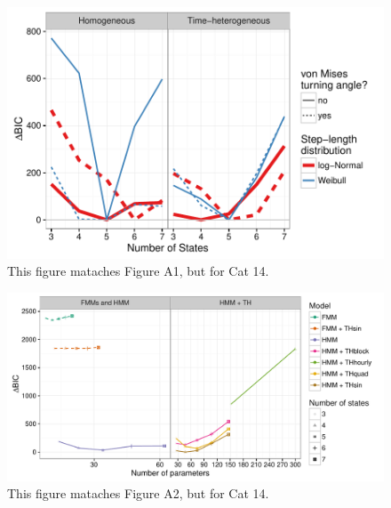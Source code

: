 \documentclass{article}\usepackage[]{graphicx}\usepackage{xcolor}
\makeatletter
\def\maxwidth{ %
  \ifdim\Gin@nat@width>\linewidth
    \linewidth
  \else
    \Gin@nat@width
  \fi
}
\newenvironment{knitrout}{}{} %
\makeatother
\begin{document}
\clearpage

\begin{knitrout}
\color{fgcolor}\begin{figure}
\includegraphics[width=\maxwidth]{figure/BICred_plot14-1} \caption{This figure mataches Figure A1, but for Cat 14.}\label{fig:BICred_plot14}
\end{figure}


\end{knitrout}


\clearpage

\begin{knitrout}
\color{fgcolor}\begin{figure}
\includegraphics[width=\maxwidth]{figure/adj_BIC_comparisons14-1} \caption{This figure mataches Figure A2, but for Cat 14.}\label{fig:adj_BIC_comparisons14}
\end{figure}


\end{knitrout}
\end{document}
